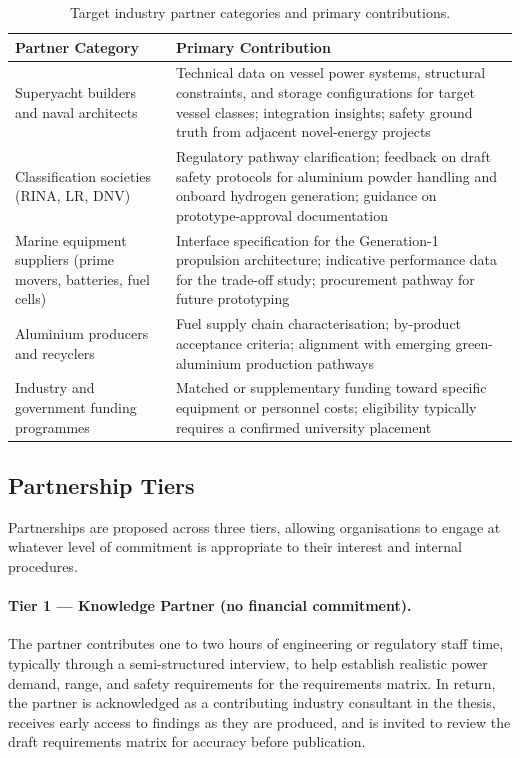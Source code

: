 \documentclass[12pt]{article}
\begin{document}
\begin{table}[h!]
\centering
\small
\setlength{\tabcolsep}{4pt}
\begin{tabularx}{\textwidth}{|>{\raggedright\arraybackslash}p{4.2cm}|>{\raggedright\arraybackslash}X|}
\hline
\textbf{Partner Category} & \textbf{Primary Contribution} \\
\hline
Superyacht builders and naval architects &
Technical data on vessel power systems, structural constraints, and
storage configurations for target vessel classes; integration insights;
safety ground truth from adjacent novel-energy projects \\
\hline
Classification societies (RINA, LR, DNV) &
Regulatory pathway clarification; feedback on draft safety protocols
for aluminium powder handling and onboard hydrogen generation;
guidance on prototype-approval documentation \\
\hline
Marine equipment suppliers (prime movers, batteries, fuel cells) &
Interface specification for the Generation-1 propulsion architecture;
indicative performance data for the trade-off study; procurement
pathway for future prototyping \\
\hline
Aluminium producers and recyclers &
Fuel supply chain characterisation; by-product acceptance criteria;
alignment with emerging green-aluminium production pathways \\
\hline
Industry and government funding programmes &
Matched or supplementary funding toward specific equipment or
personnel costs; eligibility typically requires a confirmed university
placement \\
\hline
\end{tabularx}
\caption{Target industry partner categories and primary contributions.}
\label{tab:partner-categories}
\end{table}

\subsection{Partnership Tiers}

Partnerships are proposed across three tiers, allowing organisations to
engage at whatever level of commitment is appropriate to their
interest and internal procedures.

\paragraph{Tier 1 --- Knowledge Partner (no financial commitment).}
The partner contributes one to two hours of engineering or regulatory
staff time, typically through a semi-structured interview, to help
establish realistic power demand, range, and safety requirements for
the requirements matrix. In return, the partner is acknowledged as a
contributing industry consultant in the thesis, receives early access
to findings as they are produced, and is invited to review the draft
requirements matrix for accuracy before publication.
\end{document}
